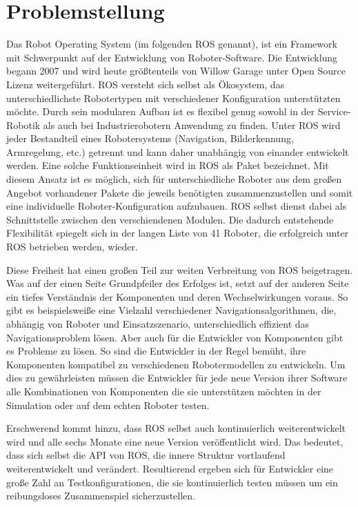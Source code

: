 \documentclass{scrreprt}
\begin{document}
\chapter{Problemstellung}

Das Robot Operating System (im folgenden ROS genannt), ist ein Framework mit Schwerpunkt auf der Entwicklung von Roboter-Software. Die Entwicklung begann 2007 und wird heute größtenteils von Willow Garage unter Open Source Lizenz weitergeführt. ROS versteht sich selbst als Ökosystem, das unterschiedlichste Robotertypen mit verschiedener Konfiguration unterstützten möchte. Durch sein modularen Aufbau ist es flexibel genug sowohl in der Service-Robotik als auch bei Industrierobotern Anwendung zu finden. Unter ROS wird jeder Bestandteil eines Robotersystems (Navigation, Bilderkennung, Armregelung, etc.) getrennt und kann daher unabhängig von einander entwickelt werden. Eine solche Funktionseinheit wird in ROS als Paket bezeichnet. Mit diesem Ansatz ist es möglich, sich für unterschiedliche Roboter aus dem großen Angebot vorhandener Pakete die jeweils benötigten zusammenzustellen und somit eine individuelle Roboter-Konfiguration aufzubauen. ROS selbst dienst dabei als Schnittstelle zwischen den verschiendenen Modulen. Die dadurch entstehende Flexibilität spiegelt sich in der langen Liste von 41 Roboter\cite{ros_robot_list}, die erfolgreich unter ROS betrieben werden, wieder.

Diese Freiheit hat einen großen Teil zur weiten Verbreitung von ROS beigetragen. Was auf der einen Seite Grundpfeiler des Erfolges ist, setzt auf der anderen Seite ein tiefes Verständnis der Komponenten und deren Wechselwirkungen voraus. So gibt es beispielsweiße eine Vielzahl verschiedener Navigationsalgorithmen, die, abhängig von Roboter und Einsatzszenario, unterschiedlich effizient das Navigationsproblem lösen. Aber auch für die Entwickler von Komponenten gibt es Probleme zu lösen. So sind die Entwickler in der Regel bemüht, ihre Komponenten kompatibel zu verschiedenen Robotermodellen zu entwickeln. Um dies zu gewährleisten müssen die Entwickler für jede neue Version ihrer Software alle Kombinationen von Komponenten die sie unterstützen möchten in der Simulation oder auf dem echten Roboter testen. 

Erschwerend kommt hinzu, dass ROS selbst auch kontinuierlich weiterentwickelt wird und alle sechs Monate eine neue Version veröffentlicht wird. Das bedeutet, dass sich selbst die API von ROS, die innere Struktur vortlaufend weiterentwickelt und verändert. Resultierend ergeben sich für Entwickler eine große Zahl an Testkonfigurationen, die sie kontinuierlich testen müssen um ein reibungsloses Zusammenspiel sicherzustellen.
\end{document}
